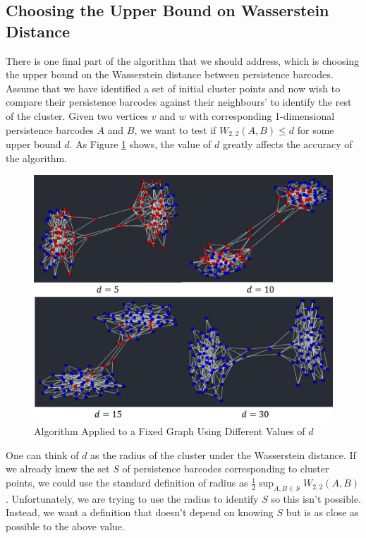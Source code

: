 \documentclass[12pt,a4paper]{amsart}
\numberwithin{equation}{section}
\theoremstyle{plain}
\theoremstyle{definition}
\begin{document}
\subsection{Choosing the Upper Bound on Wasserstein Distance}

There is one final part of the algorithm that we should address, which is choosing the upper bound on the Wasserstein distance between persistence barcodes. Assume that we have identified a set of initial cluster points and now wish to compare their persistence barcodes against their neighbours' to identify the rest of the cluster. Given two vertices $v$ and $w$ with corresponding 1-dimensional persistence barcodes $A$ and $B$, we want to test if $W_{2,2}(A,B) \leq d$ for some upper bound $d$. As Figure \ref{upperBound} shows, the value of $d$ greatly affects the accuracy of the algorithm.

\begin{figure}[h]
	\centering
	\includegraphics[scale=0.6]{UpperBound.jpg}
	\caption{Algorithm Applied to a Fixed Graph Using Different Values of $d$}
	\label{upperBound}
\end{figure}

\newpage

One can think of $d$ as the radius of the cluster under the Wasserstein distance. If we already knew the set $S$ of persistence barcodes corresponding to cluster points, we could use the standard definition of radius as $\frac{1}{2}\sup_{A,B \in S} W_{2,2}(A,B)$. Unfortunately, we are  trying to use the radius to identify $S$ so this isn't possible. Instead, we want a definition that doesn't depend on knowing $S$ but is as close as possible to the above value.
\end{document}
